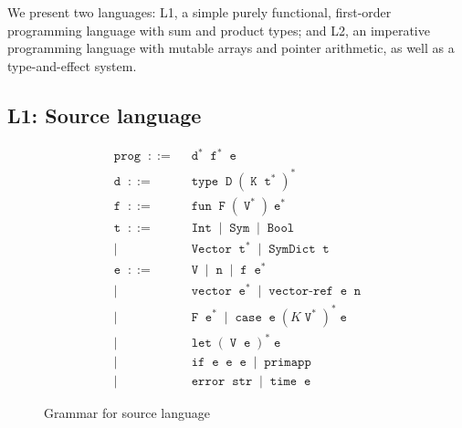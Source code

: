 \documentclass[preprint,10pt,nocopyrightspace,nonatbib]{./bibs/sigplanconf}
\newcommand{\gramdef}{\; ::= \;}
\newcommand{\gramor}{\; | \;}
\newcommand{\keywd}[1]{\; \texttt{#1} \;}
\newcommand{\keywdr}[1]{\; \texttt{#1}^{*} \;}
\begin{document}

We present two languages: L1, a simple purely functional, first-order programming
language with sum and product types; and L2, an imperative programming language
with mutable arrays and pointer arithmetic, as well as a type-and-effect system.

\subsection{L1: Source language}



\begin{figure}
  \begin{displaymath}
    \begin{aligned}
      \keywd{prog} \gramdef & \keywdr{d} \keywdr{f} \keywd{e} \\
      \keywd{d} \gramdef & \keywd{type} \keywd{D} (\keywd{K} \keywdr{t})^{*} \\
      \keywd{f} \gramdef & \keywd{fun} \keywd{F} ( \keywdr{V} ) { \keywdr{e} } \\
      \keywd{t} \gramdef & \keywd{Int} \gramor \keywd{Sym} \gramor \keywd{Bool} \\
      \gramor & \keywd{Vector} \keywdr{t} \gramor \keywd{SymDict} \keywd{t} \\
      \keywd{e} \gramdef & \keywd{V} \gramor \keywd{n} \gramor \keywd{f} \keywdr{e} \\
      \gramor & \keywd{vector} \keywdr{e} \gramor \keywd{vector-ref} \keywd{e} \keywd{n} \\
      \gramor & \keywd{F} \keywdr{e} \gramor \keywd{case} \keywd{e} (K \keywdr{V})^{*} \keywd{e} \\
      \gramor & \keywd{let} (\keywd{V} \keywd{e})^{*} \keywd{e} \\
      \gramor & \keywd{if} \keywd{e} \keywd{e} \keywd{e} \gramor \keywd{primapp} \\
      \gramor & \keywd{error} \keywd{str} \gramor \keywd{time} \keywd{e}  
    \end{aligned}
  \end{displaymath}
  \caption{Grammar for source language}
\end{figure}
\end{document}
